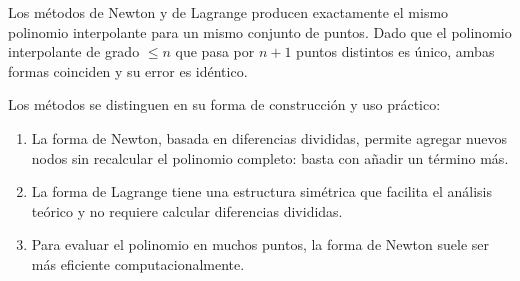 \documentclass[a4,11pt]{aleph-notas}
\begin{document}
\begin{advertencia}
    Los métodos de Newton y de Lagrange producen exactamente el mismo polinomio interpolante para un mismo conjunto de puntos. Dado que el polinomio interpolante de grado $\leq n$ que pasa por $n+1$ puntos distintos es único, ambas formas coinciden y su error es idéntico.
\end{advertencia}

Los métodos se distinguen en su forma de construcción y uso práctico:
\begin{enumerate}
    \item La forma de Newton, basada en diferencias divididas, permite agregar nuevos nodos sin recalcular el polinomio completo: basta con añadir un término más.
    \item La forma de Lagrange tiene una estructura simétrica que facilita el análisis teórico y no requiere calcular diferencias divididas.
    \item Para evaluar el polinomio en muchos puntos, la forma de Newton suele ser más eficiente computacionalmente.
\end{enumerate}
\end{document}
